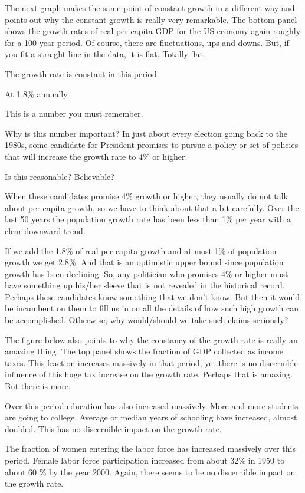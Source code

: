 \documentclass[
]{book}
\begin{document}
The next graph makes the same point of constant growth in a different way and points out why the constant growth is really very remarkable.
The bottom panel shows the growth rates of real per capita GDP for the US economy again roughly for a 100-year period. Of course, there are fluctuations, ups and downs. But, if you fit a straight line in the data, it is flat. Totally flat.

The growth rate is constant in this period.

At 1.8\% annually.

This is a number you must remember.

Why is this number important? In just about every election going back to the 1980s, some candidate for President promises to pursue a policy or set of policies that will increase the growth rate to 4\% or higher.

Is this reasonable? Believable?

When these candidates promise 4\% growth or higher, they usually do not talk about per capita growth, so we have to think about that a bit carefully. Over the last 50 years the population growth rate has been less than 1\% per year with a clear downward trend.

If we add the 1.8\% of real per capita growth and at most 1\% of population growth we get 2.8\%. And that is an optimistic upper bound since population growth has been declining. So, any politician who promises 4\% or higher must have something up his/her sleeve that is not revealed in the historical record. Perhaps these candidates know something that we don't know. But then it would be incumbent on them to fill us in on all the details of how such high growth can be accomplished. Otherwise, why would/should we take such claims seriously?

The figure below also points to why the constancy of the growth rate is really an amazing thing. The top panel shows the fraction of GDP collected as income taxes. This fraction increases massively in that period, yet there is no discernible influence of this huge tax increase on the growth rate. Perhaps that is amazing. But there is more.

Over this period education has also increased massively. More and more students are going to college. Average or median years of schooling have increased, almost doubled. This has no discernible impact on the growth rate.

The fraction of women entering the labor force has increased massively over this period. Female labor force participation increased from about 32\% in 1950 to about 60 \% by the year 2000. Again, there seems to be no discernible impact on the growth rate.
\end{document}
